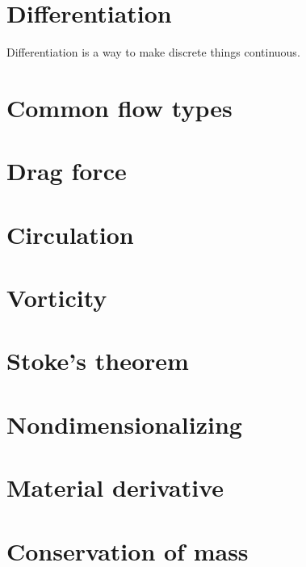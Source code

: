 \documentclass[10pt]{report}
\begin{document}
\chapter{Differentiation}

Differentiation is a way to make discrete things continuous.

\chapter{Common flow types}






\chapter{Drag force}





\chapter{Circulation}



\chapter{Vorticity}



\chapter{Stoke's theorem}



\chapter{Nondimensionalizing}



\chapter{Material derivative}



\chapter{Conservation of mass}
\end{document}
